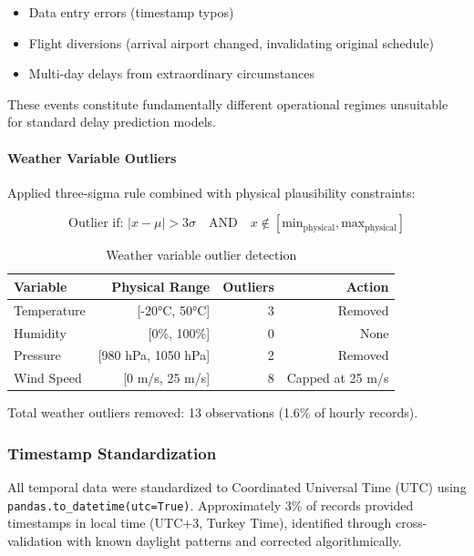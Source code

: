 \documentclass{report}
\begin{document}
\begin{itemize}
    \item Data entry errors (timestamp typos)
    \item Flight diversions (arrival airport changed, invalidating original schedule)
    \item Multi-day delays from extraordinary circumstances
\end{itemize}

These events constitute fundamentally different operational regimes unsuitable for standard delay prediction models.

\paragraph{Weather Variable Outliers}

Applied three-sigma rule combined with physical plausibility constraints:

\begin{equation}
\text{Outlier if: } |x - \mu| > 3\sigma \quad \text{AND} \quad x \notin [\text{min}_{\text{physical}}, \text{max}_{\text{physical}}]
\end{equation}

\begin{table}[h]
\centering
\caption{Weather variable outlier detection}
\label{tab:weather_outliers}
\begin{tabular}{lrrr}
\toprule
\textbf{Variable} & \textbf{Physical Range} & \textbf{Outliers} & \textbf{Action} \\
\midrule
Temperature & [-20°C, 50°C] & 3 & Removed \\
Humidity & [0\%, 100\%] & 0 & None \\
Pressure & [980 hPa, 1050 hPa] & 2 & Removed \\
Wind Speed & [0 m/s, 25 m/s] & 8 & Capped at 25 m/s \\
\bottomrule
\end{tabular}
\end{table}

Total weather outliers removed: 13 observations (1.6\% of hourly records).

\subsubsection{Timestamp Standardization}

All temporal data were standardized to Coordinated Universal Time (UTC) using \texttt{pandas.to\_datetime(utc=True)}. Approximately 3\% of records provided timestamps in local time (UTC+3, Turkey Time), identified through cross-validation with known daylight patterns and corrected algorithmically.
\end{document}
